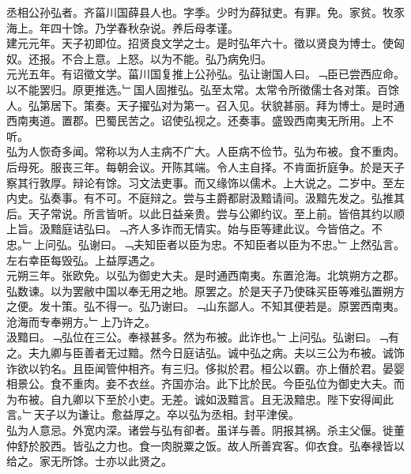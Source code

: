 \documentclass{zhvt-classic}
\begin{document}

\hspace*{2em}丞相公孙弘者。齐菑川国薛县人也。字季。少时为薛狱吏。有罪。免。家贫。牧豕海上。年四十馀。乃学春秋杂说。养后母孝谨。\\
\hspace*{2em}建元元年。天子初即位。招贤良文学之士。是时弘年六十。徵以贤良为博士。使匈奴。还报。不合上意。上怒。以为不能。弘乃病免归。\\
\hspace*{2em}元光五年。有诏徵文学。菑川国复推上公孙弘。弘让谢国人曰。﹁臣已尝西应命。以不能罢归。原更推选。﹂国人固推弘。弘至太常。太常令所徵儒士各对策。百馀人。弘第居下。策奏。天子擢弘对为第一。召入见。状貌甚丽。拜为博士。是时通西南夷道。置郡。巴蜀民苦之。诏使弘视之。还奏事。盛毁西南夷无所用。上不听。\\
\hspace*{2em}弘为人恢奇多闻。常称以为人主病不广大。人臣病不俭节。弘为布被。食不重肉。后母死。服丧三年。每朝会议。开陈其端。令人主自择。不肯面折庭争。於是天子察其行敦厚。辩论有馀。习文法吏事。而又缘饰以儒术。上大说之。二岁中。至左内史。弘奏事。有不可。不庭辩之。尝与主爵都尉汲黯请间。汲黯先发之。弘推其后。天子常说。所言皆听。以此日益亲贵。尝与公卿约议。至上前。皆倍其约以顺上旨。汲黯庭诘弘曰。﹁齐人多诈而无情实。始与臣等建此议。今皆倍之。不忠。﹂上问弘。弘谢曰。﹁夫知臣者以臣为忠。不知臣者以臣为不忠。﹂上然弘言。左右幸臣每毁弘。上益厚遇之。\\
\hspace*{2em}元朔三年。张欧免。以弘为御史大夫。是时通西南夷。东置沧海。北筑朔方之郡。弘数谏。以为罢敝中国以奉无用之地。原罢之。於是天子乃使硃买臣等难弘置朔方之便。发十策。弘不得一。弘乃谢曰。﹁山东鄙人。不知其便若是。原罢西南夷。沧海而专奉朔方。﹂上乃许之。\\
\hspace*{2em}汲黯曰。﹁弘位在三公。奉禄甚多。然为布被。此诈也。﹂上问弘。弘谢曰。﹁有之。夫九卿与臣善者无过黯。然今日庭诘弘。诚中弘之病。夫以三公为布被。诚饰诈欲以钓名。且臣闻管仲相齐。有三归。侈拟於君。桓公以霸。亦上僭於君。晏婴相景公。食不重肉。妾不衣丝。齐国亦治。此下比於民。今臣弘位为御史大夫。而为布被。自九卿以下至於小吏。无差。诚如汲黯言。且无汲黯忠。陛下安得闻此言。﹂天子以为谦让。愈益厚之。卒以弘为丞相。封平津侯。\\
\hspace*{2em}弘为人意忌。外宽内深。诸尝与弘有卻者。虽详与善。阴报其祸。杀主父偃。徙董仲舒於胶西。皆弘之力也。食一肉脱粟之饭。故人所善宾客。仰衣食。弘奉禄皆以给之。家无所馀。士亦以此贤之。\\
\end{document}
